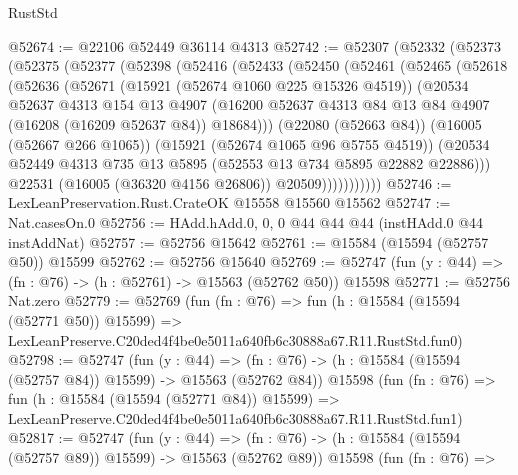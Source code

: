 \begin{lexlean}{RustStd}
\begin{coremodule}
@52674 := @22106 @52449 @36114 @4313
@52742 := @52307
    (@52332
      (@52373
        (@52375
          (@52377
            (@52398
              (@52416
                (@52433
                  (@52450
                    (@52461
                      (@52465
                        (@52618
                          (@52636
                            (@52671
                              (@15921 (@52674 @1060 @225 @15326 @4519))
                              (@20534
                                @52637
                                @4313
                                @154
                                @13
                                @4907
                                (@16200
                                  @52637
                                  @4313
                                  @84
                                  @13
                                  @84
                                  @4907
                                  (@16208 (@16209 @52637 @84))
                                  @18684)))
                            (@22080 (@52663 @84))
                            (@16005 (@52667 @266 @1065))
                            (@15921 (@52674 @1065 @96 @5755 @4519))
                            (@20534
                              @52449
                              @4313
                              @735
                              @13
                              @5895
                              (@52553 @13 @734 @5895 @22882 @22886)))
                          @22531
                          (@16005 (@36320 @4156 @26806))
                          @20509)))))))))))
@52746 := LexLeanPreservation.Rust.CrateOK @15558 @15560 @15562
@52747 := Nat.casesOn.{0}
@52756 := HAdd.hAdd.{0, 0, 0} @44 @44 @44 (instHAdd.{0} @44 instAddNat)
@52757 := @52756 @15642
@52761 := @15584 (@15594 (@52757 @50)) @15599
@52762 := @52756 @15640
@52769 := @52747 (fun (y : @44) => (fn : @76) -> (h : @52761) -> @15563 (@52762 @50)) @15598
@52771 := @52756 Nat.zero
@52779 := @52769
    (fun (fn : @76) =>
    fun (h : @15584 (@15594 (@52771 @50)) @15599) =>
    LexLeanPreserve.C20ded4f4be0e5011a640fb6c30888a67.R11.RustStd.fun0)
@52798 := @52747
    (fun (y : @44) =>
    (fn : @76) -> (h : @15584 (@15594 (@52757 @84)) @15599) -> @15563 (@52762 @84))
    @15598
    (fun (fn : @76) =>
    fun (h : @15584 (@15594 (@52771 @84)) @15599) =>
    LexLeanPreserve.C20ded4f4be0e5011a640fb6c30888a67.R11.RustStd.fun1)
@52817 := @52747
    (fun (y : @44) =>
    (fn : @76) -> (h : @15584 (@15594 (@52757 @89)) @15599) -> @15563 (@52762 @89))
    @15598
    (fun (fn : @76) =>

\end{coremodule}
\end{lexlean}
